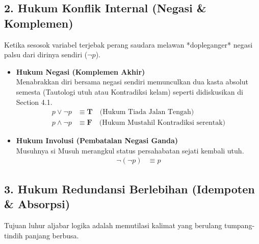 \subsection{2. Hukum Konflik Internal (Negasi \& Komplemen)}
Ketika sesosok variabel terjebak perang saudara melawan *dopleganger* negasi palsu dari dirinya sendiri ($\neg p$).

\begin{itemize}
    \item \textbf{Hukum Negasi (Komplemen Akhir)} \\
    Menabrakkan diri bersama negasi sendiri memunculkan dua kasta absolut semesta (Tautologi utuh atau Kontradiksi kelam) seperti didiskusikan di Section 4.1.
    \begin{align*}
        p \vee \neg p &\equiv \mathbf{T} \quad \text{(Hukum Tiada Jalan Tengah)} \\
        p \wedge \neg p &\equiv \mathbf{F} \quad \text{(Hukum Mustahil Kontradiksi serentak)}
    \end{align*}

    \item \textbf{Hukum Involusi (Pembatalan Negasi Ganda)} \\
    Musuhnya si Musuh merangkul status persahabatan sejati kembali utuh.
    \begin{align*}
        \neg(\neg p) &\equiv p 
    \end{align*}
\end{itemize}

\subsection{3. Hukum Redundansi Berlebihan (Idempoten \& Absorpsi)}
Tujuan luhur aljabar logika adalah memutilasi kalimat yang berulang tumpang-tindih panjang berbusa.

